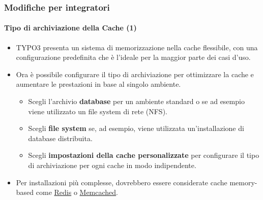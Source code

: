 \begin{frame}[fragile]
	\frametitle{Modifiche per integratori}
	\framesubtitle{Tipo di archiviazione della Cache (1)}

	\begin{itemize}

		\item TYPO3 presenta un sistema di memorizzazione nella cache flessibile, con una
		    configurazione predefinita che è l'ideale per la maggior parte dei casi d'uso.
		\item Ora è possibile configurare il tipo di archiviazione per ottimizzare la cache
		    e aumentare le prestazioni in base al singolo ambiente.

			\begin{itemize}
				\item Scegli l'archivio \textbf{database} per un ambiente standard o se ad
					esempio viene utilizzato un file system di rete (NFS).
				\item Scegli \textbf{file system} se, ad esempio, viene utilizzata un'installazione
				    di database distribuita.
				\item Scegli \textbf{impostazioni della cache personalizzate} per configurare il tipo
				    di archiviazione per ogni cache in modo indipendente.
			\end{itemize}

		\item Per installazioni più complesse, dovrebbero essere considerate cache memory-based come
			\href{https://redis.io/}{Redis}
			o
			\href{https://memcached.org/}{Memcached}.

	\end{itemize}

\end{frame}


%

